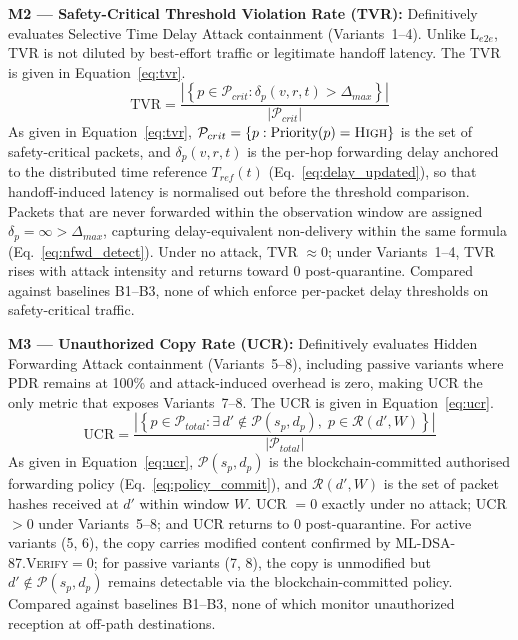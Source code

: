 \documentclass[12pt, a4paper]{report}
\begin{document}
{{%

\textbf{M2 — Safety-Critical Threshold Violation Rate (TVR):}
Definitively evaluates Selective Time Delay Attack
containment (Variants~1--4). Unlike L$_{e2e}$, TVR
is not diluted by best-effort traffic or legitimate
handoff latency. The TVR is given in
Equation~\eqref{eq:tvr}.
\begin{equation}
\text{TVR} =
\frac{\left|\left\{
p \in \mathcal{P}_{crit} :
\delta_p(v,r,t) > \Delta_{max}
\right\}\right|}{|\mathcal{P}_{crit}|}
\label{eq:tvr}
\end{equation}
As given in Equation~\eqref{eq:tvr},
$\mathcal{P}_{crit} = \{p :
\text{Priority}(p) = \textsc{High}\}$ is the set
of safety-critical packets, and $\delta_p(v,r,t)$
is the per-hop forwarding delay anchored to the
distributed time reference $T_{ref}(t)$
(Eq.~\ref{eq:delay_updated}), so that handoff-induced
latency is normalised out before the threshold
comparison. Packets that are never forwarded within
the observation window are assigned $\delta_p =
\infty > \Delta_{max}$, capturing delay-equivalent
non-delivery within the same formula
(Eq.~\ref{eq:nfwd_detect}). Under no attack,
TVR $\approx 0$; under Variants~1--4, TVR rises with
attack intensity and returns toward 0 post-quarantine.
Compared against baselines B1--B3, none of which
enforce per-packet delay thresholds on safety-critical
traffic.



\textbf{M3 — Unauthorized Copy Rate (UCR):}
Definitively evaluates Hidden Forwarding Attack
containment (Variants~5--8), including passive variants
where \ac{PDR} remains at 100\% and attack-induced
overhead is zero, making UCR the only metric that
exposes Variants~7--8. The UCR is given in
Equation~\eqref{eq:ucr}.
\begin{equation}
\text{UCR} =
\frac{\left|\left\{
p \in \mathcal{P}_{total} :
\exists\, d' \notin \mathcal{P}(s_p, d_p),\;
p \in \mathcal{R}(d', W)
\right\}\right|}{|\mathcal{P}_{total}|}
\label{eq:ucr}
\end{equation}
As given in Equation~\eqref{eq:ucr},
$\mathcal{P}(s_p, d_p)$ is the blockchain-committed
authorised forwarding policy (Eq.~\ref{eq:policy_commit}),
and $\mathcal{R}(d', W)$ is the set of packet hashes
received at $d'$ within window $W$. UCR $= 0$ exactly
under no attack; UCR $> 0$ under Variants~5--8;
and UCR returns to 0 post-quarantine. For active
variants (5, 6), the copy carries modified content
confirmed by \textsc{ML-DSA-87.Verify}$= 0$; for
passive variants (7, 8), the copy is unmodified
but $d' \notin \mathcal{P}(s_p, d_p)$ remains
detectable via the blockchain-committed policy.
Compared against baselines B1--B3, none of which
monitor unauthorized reception at off-path destinations.


}}
\end{document}
